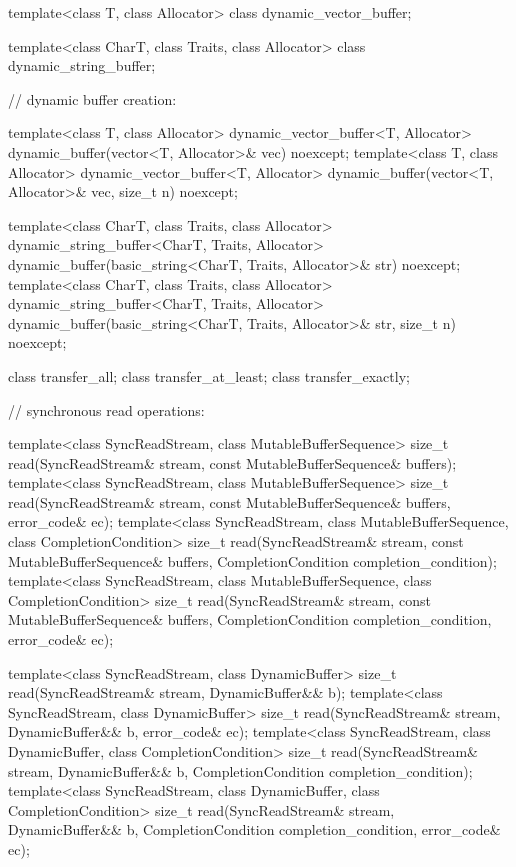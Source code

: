 \begin{codeblock}
{{{{  template<class T, class Allocator>
    class dynamic_vector_buffer;

  template<class CharT, class Traits, class Allocator>
    class dynamic_string_buffer;

  // dynamic buffer creation:

  template<class T, class Allocator>
    dynamic_vector_buffer<T, Allocator>
      dynamic_buffer(vector<T, Allocator>& vec) noexcept;
  template<class T, class Allocator>
    dynamic_vector_buffer<T, Allocator>
      dynamic_buffer(vector<T, Allocator>& vec, size_t n) noexcept;

  template<class CharT, class Traits, class Allocator>
    dynamic_string_buffer<CharT, Traits, Allocator>
      dynamic_buffer(basic_string<CharT, Traits, Allocator>& str) noexcept;
  template<class CharT, class Traits, class Allocator>
    dynamic_string_buffer<CharT, Traits, Allocator>
      dynamic_buffer(basic_string<CharT, Traits, Allocator>& str, size_t n) noexcept;

  class transfer_all;
  class transfer_at_least;
  class transfer_exactly;

  // synchronous read operations:

  template<class SyncReadStream, class MutableBufferSequence>
    size_t read(SyncReadStream& stream,
                const MutableBufferSequence& buffers);
  template<class SyncReadStream, class MutableBufferSequence>
    size_t read(SyncReadStream& stream,
                const MutableBufferSequence& buffers, error_code& ec);
  template<class SyncReadStream, class MutableBufferSequence,
    class CompletionCondition>
      size_t read(SyncReadStream& stream,
                  const MutableBufferSequence& buffers,
                  CompletionCondition completion_condition);
  template<class SyncReadStream, class MutableBufferSequence,
    class CompletionCondition>
      size_t read(SyncReadStream& stream,
                  const MutableBufferSequence& buffers,
                  CompletionCondition completion_condition,
                  error_code& ec);

  template<class SyncReadStream, class DynamicBuffer>
    size_t read(SyncReadStream& stream, DynamicBuffer&& b);
  template<class SyncReadStream, class DynamicBuffer>
    size_t read(SyncReadStream& stream, DynamicBuffer&& b, error_code& ec);
  template<class SyncReadStream, class DynamicBuffer, class CompletionCondition>
    size_t read(SyncReadStream& stream, DynamicBuffer&& b,
                CompletionCondition completion_condition);
  template<class SyncReadStream, class DynamicBuffer, class CompletionCondition>
    size_t read(SyncReadStream& stream, DynamicBuffer&& b,
                CompletionCondition completion_condition, error_code& ec);

}}}}
\end{codeblock}
